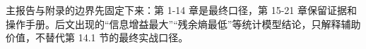 主报告与附录的边界先固定下来：第 1-14 章是最终口径，第 15-21 章保留证据和操作手册。后文出现的“信息增益最大”“残余熵最低”等统计模型结论，只解释辅助价值，不替代第 14.1 节的最终实战口径。
